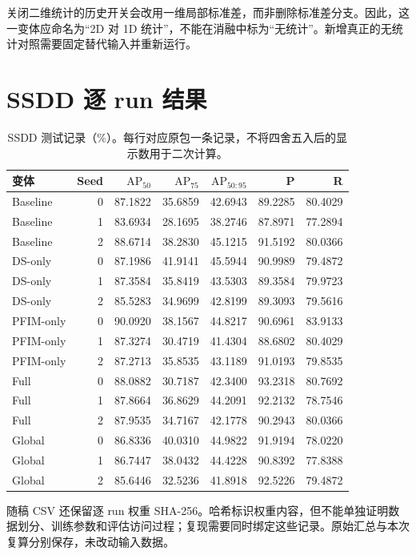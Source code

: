 \documentclass[UTF8,11pt,a4paper,fontset=fandol]{ctexart}
\newcommand{\ap}{\mathrm{AP}}
\begin{document}
关闭二维统计的历史开关会改用一维局部标准差，而非删除标准差分支。因此，这一变体应命名为“2D 对 1D 统计”，不能在消融中标为“无统计”。新增真正的无统计对照需要固定替代输入并重新运行。

\section{SSDD 逐 run 结果}\label{app:individual}
\begin{table}[H]\centering\small
\caption{SSDD 测试记录（\%）。每行对应原包一条记录，不将四舍五入后的显示数用于二次计算。}
\begin{tabular}{lrrrrrr}
\toprule
变体 & Seed & $\ap_{50}$ & $\ap_{75}$ & $\ap_{50:95}$ & P & R\\
\midrule
Baseline & 0 & 87.1822 & 35.6859 & 42.6943 & 89.2285 & 80.4029\\
Baseline & 1 & 83.6934 & 28.1695 & 38.2746 & 87.8971 & 77.2894\\
Baseline & 2 & 88.6714 & 38.2830 & 45.1215 & 91.5192 & 80.0366\\
DS-only & 0 & 87.1986 & 41.9141 & 45.5944 & 90.9989 & 79.4872\\
DS-only & 1 & 87.3584 & 35.8419 & 43.5303 & 89.3584 & 79.9723\\
DS-only & 2 & 85.5283 & 34.9699 & 42.8199 & 89.3093 & 79.5616\\
PFIM-only & 0 & 90.0920 & 38.1567 & 44.8217 & 90.6961 & 83.9133\\
PFIM-only & 1 & 87.3274 & 30.4719 & 41.4304 & 88.6802 & 80.4029\\
PFIM-only & 2 & 87.2713 & 35.8535 & 43.1189 & 91.0193 & 79.8535\\
Full & 0 & 88.0882 & 30.7187 & 42.3400 & 93.2318 & 80.7692\\
Full & 1 & 87.8664 & 36.8629 & 44.2091 & 92.2132 & 78.7546\\
Full & 2 & 87.9535 & 34.7167 & 42.1778 & 90.2943 & 80.0366\\
Global & 0 & 86.8336 & 40.0310 & 44.9822 & 91.9194 & 78.0220\\
Global & 1 & 86.7447 & 38.0432 & 44.4228 & 90.8392 & 77.8388\\
Global & 2 & 85.6446 & 32.5236 & 41.8918 & 92.5226 & 79.4872\\
\bottomrule
\end{tabular}
\end{table}
随稿 CSV 还保留逐 run 权重 SHA-256。哈希标识权重内容，但不能单独证明数据划分、训练参数和评估访问过程；复现需要同时绑定这些记录。原始汇总与本次复算分别保存，未改动输入数据。
\end{document}

